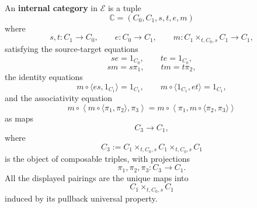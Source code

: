 \begin{definition}
\label{def:internal-category-as-endospan-monoid}
    An \textbf{internal category} in \(\mathcal E\) is a tuple
    \[
        \mathbb C=(C_0,C_1,s,t,e,m)
    \]
    where
    \[
        s,t:C_1\to C_0,
        \qquad
        e:C_0\to C_1,
        \qquad
        m:C_1\times_{t,C_0,s}C_1\to C_1,
    \]
    satisfying the source-target equations
    \[
        se=1_{C_0},
        \qquad
        te=1_{C_0},
    \]
    \[
        sm=s\pi_1,
        \qquad
        tm=t\pi_2,
    \]
    the identity equations
    \[
        m\circ\langle es,1_{C_1}\rangle
        =
        1_{C_1},
        \qquad
        m\circ\langle 1_{C_1},et\rangle
        =
        1_{C_1},
    \]
    and the associativity equation
    \[
        m\circ
        \left\langle
            m\circ\langle\pi_1,\pi_2\rangle,
            \pi_3
        \right\rangle
        =
        m\circ
        \left\langle
            \pi_1,
            m\circ\langle\pi_2,\pi_3\rangle
        \right\rangle
    \]
    as maps
    \[
        C_3\to C_1,
    \]
    where
    \[
        C_3
        :=
        C_1\times_{t,C_0,s}
        C_1\times_{t,C_0,s}
        C_1
    \]
    is the object of composable triples, with projections
    \[
        \pi_1,\pi_2,\pi_3:C_3\to C_1.
    \]
    All the displayed pairings are the unique maps into
    \[
        C_1\times_{t,C_0,s}C_1
    \]
    induced by its pullback universal property.
\end{definition}

